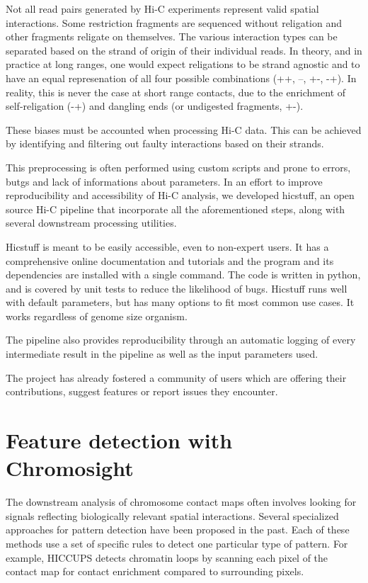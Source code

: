 Not all read pairs generated by Hi-C experiments represent valid spatial interactions. Some restriction fragments are sequenced without religation and other fragments religate on themselves. The various interaction types can be separated based on the strand of origin of their individual reads. In theory, and in practice at long ranges, one would expect religations to be strand agnostic and to have an equal represenation of all four possible combinations (++, --, +-, -+). In reality, this is never the case at short range contacts, due to the enrichment of self-religation (-+) and dangling ends (or undigested fragments, +-).

These biases must be accounted when processing Hi-C data. This can be achieved by identifying and filtering out faulty interactions based on their strands.

This preprocessing is often performed using custom scripts and prone to errors, butgs and lack of informations about parameters. In an effort to improve reproducibility and accessibility of Hi-C analysis, we developed hicstuff, an open source Hi-C pipeline that incorporate all the aforementioned steps, along with several downstream processing utilities.

Hicstuff is meant to be easily accessible, even to non-expert users. It has a comprehensive online documentation and tutorials and the program and its dependencies are installed with a single command. The code is written in python, and is covered by unit tests to reduce the likelihood of bugs. Hicstuff runs well with default parameters, but has many options to fit most common use cases. It works regardless of genome size organism.

The pipeline also provides reproducibility through an automatic logging of every intermediate result in the pipeline as well as the input parameters used.

The project has already fostered a community of users which are offering their contributions, suggest features or report issues they encounter.

\section{Feature detection with Chromosight}

The downstream analysis of chromosome contact maps often involves looking for signals reflecting biologically relevant spatial interactions. Several specialized approaches for pattern detection have been proposed in the past. Each of these methods use a set of specific rules to detect one particular type of pattern. For example, HICCUPS \cite{rao3DMapHuman2014} detects chromatin loops by scanning each pixel of the contact map for contact enrichment compared to surrounding pixels.

